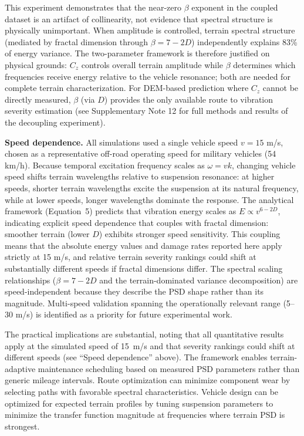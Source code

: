 \documentclass[11pt]{article}
\begin{document}
This experiment demonstrates that the near-zero $\beta$ exponent in the coupled dataset is an artifact of collinearity, not evidence that spectral structure is physically unimportant. When amplitude is controlled, terrain spectral structure (mediated by fractal dimension through $\beta = 7-2D$) independently explains 83\% of energy variance. The two-parameter framework is therefore justified on physical grounds: $C_z$ controls overall terrain amplitude while $\beta$ determines which frequencies receive energy relative to the vehicle resonance; both are needed for complete terrain characterization. For DEM-based prediction where $C_z$ cannot be directly measured, $\beta$ (via $D$) provides the only available route to vibration severity estimation (see Supplementary Note 12 for full methods and results of the decoupling experiment).

\textbf{Speed dependence.} All simulations used a single vehicle speed $v = 15$ m/s, chosen as a representative off-road operating speed for military vehicles (54 km/h). Because temporal excitation frequency scales as $\omega = vk$, changing vehicle speed shifts terrain wavelengths relative to suspension resonance: at higher speeds, shorter terrain wavelengths excite the suspension at its natural frequency, while at lower speeds, longer wavelengths dominate the response. The analytical framework (Equation~5) predicts that vibration energy scales as $E \propto v^{6-2D}$, indicating explicit speed dependence that couples with fractal dimension: smoother terrain (lower $D$) exhibits stronger speed sensitivity. This coupling means that the absolute energy values and damage rates reported here apply strictly at 15 m/s, and relative terrain severity rankings could shift at substantially different speeds if fractal dimensions differ. The spectral scaling relationships ($\beta = 7-2D$ and the terrain-dominated variance decomposition) are speed-independent because they describe the PSD shape rather than its magnitude. Multi-speed validation spanning the operationally relevant range (5--30 m/s) is identified as a priority for future experimental work.

The practical implications are substantial, noting that all quantitative results apply at the simulated speed of 15~m/s and that severity rankings could shift at different speeds (see ``Speed dependence'' above). The framework enables terrain-adaptive maintenance scheduling based on measured PSD parameters rather than generic mileage intervals. Route optimization can minimize component wear by selecting paths with favorable spectral characteristics. Vehicle design can be optimized for expected terrain profiles by tuning suspension parameters to minimize the transfer function magnitude at frequencies where terrain PSD is strongest.
\end{document}
